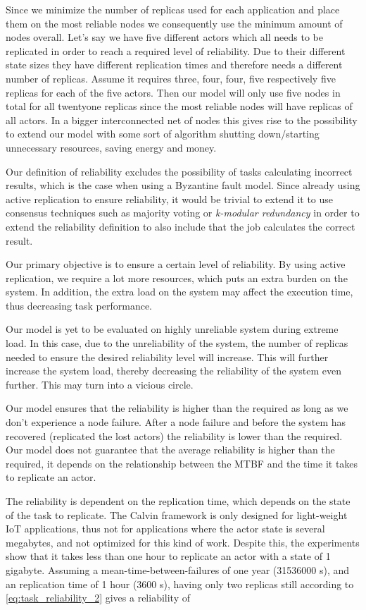 \documentclass{cslthse-msc}
\begin{document}
Since we minimize the number of replicas used for each application and place them on the most reliable nodes we consequently use the minimum amount of nodes overall. Let's say we have five different actors which all needs to be replicated in order to reach a required level of reliability. Due to their different state sizes they have different replication times and therefore needs a different number of replicas. Assume it requires three, four, four, five respectively five replicas for each of the five actors. Then our model will only use five nodes in total for all twentyone replicas since the most reliable nodes will have replicas of all actors. In a bigger interconnected net of nodes this gives rise to the possibility to extend our model with some sort of algorithm shutting down/starting unnecessary resources, saving energy and money.

Our definition of reliability excludes the possibility of tasks calculating incorrect results, which is the case when using a Byzantine fault model. Since already using active replication to ensure reliability, it would be trivial to extend it to use consensus techniques such as majority voting or \emph{k-modular redundancy} in order to extend the reliability definition to also include that the job calculates the correct result.

Our primary objective is to ensure a certain level of reliability. By using active replication, we require a lot more resources, which puts an extra burden on the system. In addition, the extra load on the system may affect the execution time, thus decreasing task performance.

Our model is yet to be evaluated on highly unreliable system during extreme load. In this case, due to the unreliability of the system, the number of replicas needed to ensure the desired reliability level will increase. This will further increase the system load, thereby decreasing the reliability of the system even further. This may turn into a vicious circle.

Our model ensures that the reliability is higher than the required as long as we don't experience a node failure. After a node failure and before the system has recovered (replicated the lost actors) the reliability is lower than the required. Our model does not guarantee that the average reliability is higher than the required, it depends on the relationship between the MTBF and the time it takes to replicate an actor.

The reliability is dependent on the replication time, which depends on the state of the task to replicate. The Calvin framework is only designed for light-weight IoT applications, thus not for applications where the actor state is several megabytes, and not optimized for this kind of work. Despite this, the experiments show that it takes less than one hour to replicate an actor with a state of 1 gigabyte. Assuming a mean-time-between-failures of one year (31536000 s), and an replication time of 1 hour (3600 s), having only two replicas still according to \cref{eq:task_reliability_2} gives a reliability of
\end{document}

